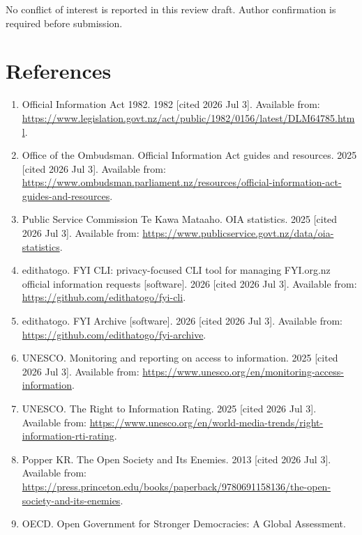 \documentclass[
]{article}
\providecommand{\tightlist}{%
  \setlength{\itemsep}{0pt}\setlength{\parskip}{0pt}}
\begin{document}
No conflict of interest is reported in this review draft. Author
confirmation is required before submission.

\section{References}\label{references}

\begin{enumerate}
\def\labelenumi{\arabic{enumi}.}
\tightlist
\hypertarget{ref-1}{}
\item
  Official Information Act 1982. 1982 {[}cited 2026 Jul 3{]}. Available
  from:
  \url{https://www.legislation.govt.nz/act/public/1982/0156/latest/DLM64785.html}.
\hypertarget{ref-2}{}
\item
  Office of the Ombudsman. Official Information Act guides and
  resources. 2025 {[}cited 2026 Jul 3{]}. Available from:
  \url{https://www.ombudsman.parliament.nz/resources/official-information-act-guides-and-resources}.
\hypertarget{ref-3}{}
\item
  Public Service Commission Te Kawa Mataaho. OIA statistics. 2025
  {[}cited 2026 Jul 3{]}. Available from:
  \url{https://www.publicservice.govt.nz/data/oia-statistics}.
\hypertarget{ref-4}{}
\item
  edithatogo. FYI CLI: privacy-focused CLI tool for managing FYI.org.nz
  official information requests {[}software{]}. 2026 {[}cited 2026 Jul
  3{]}. Available from: \url{https://github.com/edithatogo/fyi-cli}.
\hypertarget{ref-5}{}
\item
  edithatogo. FYI Archive {[}software{]}. 2026 {[}cited 2026 Jul 3{]}.
  Available from: \url{https://github.com/edithatogo/fyi-archive}.
\hypertarget{ref-6}{}
\item
  UNESCO. Monitoring and reporting on access to information. 2025
  {[}cited 2026 Jul 3{]}. Available from:
  \url{https://www.unesco.org/en/monitoring-access-information}.
\hypertarget{ref-7}{}
\item
  UNESCO. The Right to Information Rating. 2025 {[}cited 2026 Jul 3{]}.
  Available from:
  \url{https://www.unesco.org/en/world-media-trends/right-information-rti-rating}.
\hypertarget{ref-8}{}
\item
  Popper KR. The Open Society and Its Enemies. 2013 {[}cited 2026 Jul
  3{]}. Available from:
  \url{https://press.princeton.edu/books/paperback/9780691158136/the-open-society-and-its-enemies}.
\hypertarget{ref-9}{}
\item
  OECD. Open Government for Stronger Democracies: A Global Assessment.

\end{enumerate}
\end{document}
